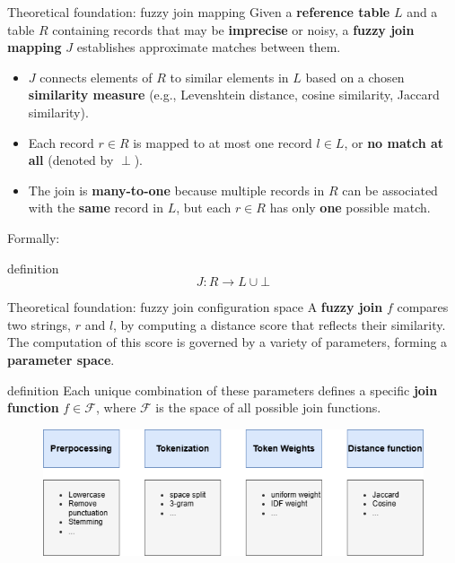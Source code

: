 \documentclass[8pt]{beamer} %
\begin{document}

\begin{frame}{Theoretical foundation: fuzzy join mapping}
	Given a \textbf{reference table} $L$ and a table $R$ containing records that may be \textbf{imprecise} or noisy, a \textbf{fuzzy join mapping} $J$ establishes approximate matches between them.
	
	\begin{itemize}
	\item $J$ connects elements of $R$ to similar elements in $L$ based on a chosen \textbf{similarity measure} (e.g., Levenshtein distance, cosine similarity, Jaccard similarity).
	\item Each record $r \in R$ is mapped to at most one record $l \in L$, or \textbf{no match at all} (denoted by $\perp$).
	\item The join is \textbf{many-to-one} because multiple records in $R$ can be associated with the \textbf{same} record in $L$, but each $r \in R$ has only \textbf{one} possible match.
	\end{itemize}
	
	Formally:
	\begin{beamercolorbox}[rounded=true, shadow=true, leftskip=1em, rightskip=1em]{definition}
		$$
		J: R \rightarrow L \cup \bot
		$$
	\end{beamercolorbox}
\end{frame}


\begin{frame}{Theoretical foundation: fuzzy join configuration space}
	A \textbf{fuzzy join} $f$ compares two strings, $r$ and $l$, by computing a distance score that reflects their similarity. The computation of this score is governed by a variety of parameters, forming a \textbf{parameter space}. 
	
	\vspace{1em}

	\begin{beamercolorbox}[rounded=true, shadow=true, leftskip=1em, rightskip=1em]{definition}
		Each unique combination of these parameters defines a specific \textbf{join function} $f \in \mathcal{F}$, where $\mathcal{F}$ is the space of all possible join functions.
	\end{beamercolorbox}

	\vspace{1em}
		
	\begin{figure}
		\centering
				\includegraphics[width=0.7\linewidth]{img/join_configuration.png}
	\end{figure}
\end{frame}
\end{document}

